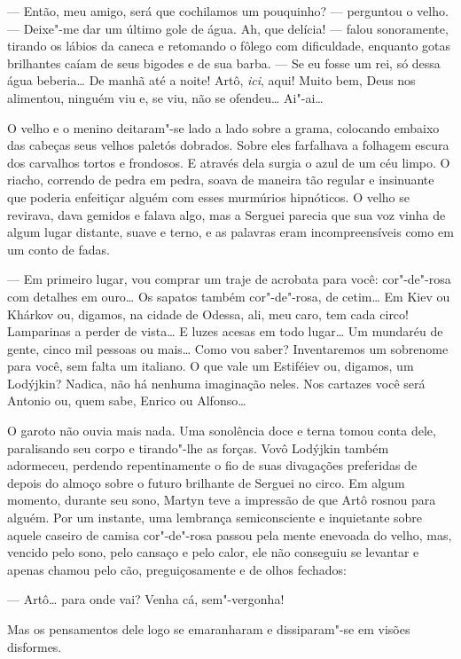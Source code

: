 --- Então, meu amigo, será que cochilamos um pouquinho? --- perguntou o
velho. --- Deixe"-me dar um último gole de água. Ah, que delícia! ---
falou sonoramente, tirando os lábios da caneca e retomando o fôlego com
dificuldade, enquanto gotas brilhantes caíam de seus bigodes e de sua
barba. --- Se eu fosse um rei, só dessa água beberia\ldots{} De manhã até a
noite! Artô, \emph{ici}, aqui! Muito bem, Deus nos alimentou, ninguém
viu e, se viu, não se ofendeu\ldots{} Ai"-ai\ldots{}

O velho e o menino deitaram"-se lado a lado sobre a grama, colocando embaixo
das cabeças seus velhos paletós dobrados. Sobre eles farfalhava a
folhagem escura dos carvalhos tortos e frondosos. E através dela surgia
o azul de um céu limpo. O riacho, correndo de pedra em pedra, soava de
maneira tão regular e insinuante que poderia enfeitiçar alguém com
esses murmúrios hipnóticos. O velho se revirava, dava gemidos e falava
algo, mas a Serguei parecia que sua voz vinha de algum lugar distante,
suave e terno, e as palavras eram incompreensíveis como em um conto de
fadas.

--- Em primeiro lugar, vou comprar um traje de acrobata para você:
cor"-de"-rosa com detalhes em ouro\ldots{} Os sapatos também cor"-de"-rosa, de
cetim\ldots{} Em Kiev ou Khárkov ou, digamos, na cidade de Odessa, ali, meu
caro, tem cada circo! Lamparinas a perder de vista\ldots{} E luzes acesas em
todo lugar\ldots{} Um mundaréu de gente, cinco mil pessoas ou mais\ldots{} Como
vou saber? Inventaremos um sobrenome para você, sem falta um italiano. O
que vale um Estiféiev ou, digamos, um Lodýjkin? Nadica, não há nenhuma
imaginação neles. Nos cartazes você será Antonio ou, quem sabe,
Enrico ou Alfonso\ldots{}

O garoto não ouvia mais nada. Uma sonolência doce e terna tomou conta
dele, paralisando seu corpo e tirando"-lhe as forças. Vovô Lodýjkin também
adormeceu, perdendo repentinamente o fio de suas divagações preferidas
de depois do almoço sobre o futuro brilhante de Serguei no circo. Em
algum momento, durante seu sono, Martyn teve a impressão de que Artô
rosnou para alguém. Por um instante, uma lembrança semiconsciente e
inquietante sobre aquele caseiro de camisa cor"-de"-rosa passou pela mente
enevoada do velho, mas, vencido pelo sono, pelo cansaço e pelo calor,
ele não conseguiu se levantar e apenas chamou pelo cão, preguiçosamente
e de olhos fechados:

--- Artô\ldots{} para onde vai? Venha cá, sem"-vergonha!

Mas os pensamentos dele logo se emaranharam e dissiparam"-se em visões
disformes.

